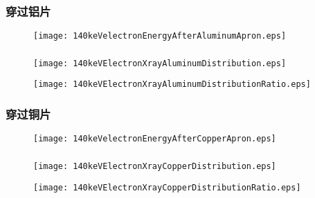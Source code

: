 \documentclass{beamer}
\begin{document}
\begin{CJK*}{UTF8}{gkai}
  \begin{frame}\frametitle{穿过铝片}
    \begin{figure}[ht]
      \texttt{[image: 140keVelectronEnergyAfterAluminumApron.eps]}
    \end{figure}
  \end{frame}
  \begin{frame}\frametitle{}
    \begin{figure}[ht]
      \texttt{[image: 140keVElectronXrayAluminumDistribution.eps]}

      \texttt{[image: 140keVElectronXrayAluminumDistributionRatio.eps]}
    \end{figure}
  \end{frame}
  \begin{frame}\frametitle{穿过铜片}
    \begin{figure}[ht]
      \texttt{[image: 140keVelectronEnergyAfterCopperApron.eps]}
    \end{figure}
  \end{frame}
  \begin{frame}\frametitle{}
    \begin{figure}[ht]
      \texttt{[image: 140keVElectronXrayCopperDistribution.eps]}

      \texttt{[image: 140keVElectronXrayCopperDistributionRatio.eps]}
    \end{figure}
  \end{frame}


\end{CJK*}
\end{document}

